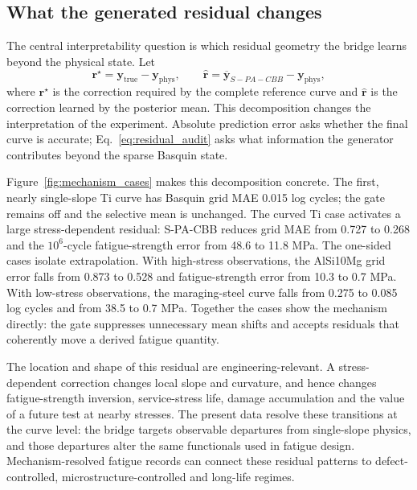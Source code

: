 \documentclass[a4paper,fleqn]{cas-dc}
\newcommand{\method}{S-PA-CBB}
\newcommand{\vect}[1]{\boldsymbol{#1}}
\begin{document}
\subsection{What the generated residual changes}

The central interpretability question is which residual geometry the bridge learns beyond the physical state. Let
\begin{equation}
 \vect{r}^{\star}=\vect{y}_{\mathrm{true}}-\vect{y}_{\mathrm{phys}},
 \qquad
 \hat{\vect{r}}=\overline{\vect{y}}_{\method}-\vect{y}_{\mathrm{phys}},
 \label{eq:residual_audit}
\end{equation}
where $\vect{r}^{\star}$ is the correction required by the complete reference curve and $\hat{\vect{r}}$ is the correction learned by the posterior mean. This decomposition changes the interpretation of the experiment. Absolute prediction error asks whether the final curve is accurate; Eq.~\eqref{eq:residual_audit} asks what information the generator contributes beyond the sparse Basquin state.

Figure~\ref{fig:mechanism_cases} makes this decomposition concrete. The first, nearly single-slope Ti curve has Basquin grid MAE 0.015 log cycles; the gate remains off and the selective mean is unchanged. The curved Ti case activates a large stress-dependent residual: \method{} reduces grid MAE from 0.727 to 0.268 and the $10^6$-cycle fatigue-strength error from 48.6 to 11.8 MPa. The one-sided cases isolate extrapolation. With high-stress observations, the AlSi10Mg grid error falls from 0.873 to 0.528 and fatigue-strength error from 10.3 to 0.7 MPa. With low-stress observations, the maraging-steel curve falls from 0.275 to 0.085 log cycles and from 38.5 to 0.7 MPa. Together the cases show the mechanism directly: the gate suppresses unnecessary mean shifts and accepts residuals that coherently move a derived fatigue quantity.

The location and shape of this residual are engineering-relevant. A stress-dependent correction changes local slope and curvature, and hence changes fatigue-strength inversion, service-stress life, damage accumulation and the value of a future test at nearby stresses. The present data resolve these transitions at the curve level: the bridge targets observable departures from single-slope physics, and those departures alter the same functionals used in fatigue design. Mechanism-resolved fatigue records can connect these residual patterns to defect-controlled, microstructure-controlled and long-life regimes.
\end{document}
